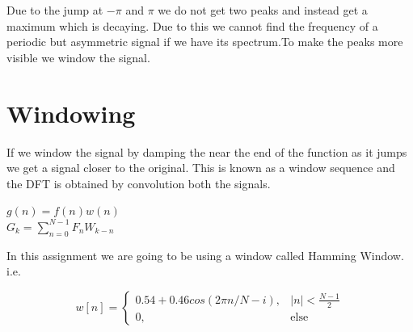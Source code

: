 \documentclass[10pt,english, openany]{book}
\begin{document}
Due to the jump at $-\pi$ and $\pi$ we do not get two peaks and instead get a maximum which is decaying. Due to this we cannot find the frequency of a periodic but asymmetric signal if we have its spectrum.To make the peaks more visible we window the signal.

\section{Windowing}

If we window the signal by damping the near the end of the function as it jumps we get a signal closer to the original. This is known as a window sequence and the DFT is obtained by convolution both the signals.\\

\begin{center}
$g(n)=f(n)w(n)$\\

$G_{k}=\sum_{n=0}^{N-1} F_{n}W_{k-n}$\\
\end{center}
In this assignment we are going to be using a window called Hamming
Window.\\
i.e.

\begin{equation*}
w[n]=\begin{cases}
0.54 + 0.46cos( 2\pi n/N-i ), & |n|<\frac{N-1}{2}\\
0, & \text{else}
\end{cases}
\end{equation*}
\end{document}
